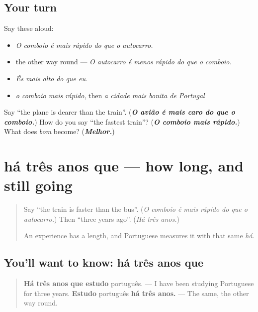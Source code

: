 \subsection*{Your turn}
Say these aloud:

\begin{itemize}
\raggedright
  \item \emph{O comboio é mais rápido do que o autocarro.}
  \item the other way round — \emph{O autocarro é menos rápido do que o comboio.}
  \item \emph{És mais alto do que eu.}
  \item \emph{o comboio mais rápido}, then \emph{a cidade mais bonita de Portugal}
\end{itemize}

\begin{tcolorbox}[breakable,colback=teal!4,colframe=teal!35!black,title={Before you move on}]
Say \textquotedblleft{}the plane is dearer than the train\textquotedblright{}. (\emph{\textbf{O avião é mais caro do que o comboio.}}) How do you say \textquotedblleft{}the fastest train\textquotedblright{}? (\emph{\textbf{O comboio mais rápido.}}) What does \emph{bom} become? (\emph{\textbf{Melhor.}})
\end{tcolorbox}
\section[há três anos que]{há três anos que — how long, and still going}

\label{lesson:PT-C266-ha-tres-anos-que}



\begin{quote}
Say \textquotedblleft{}the train is faster than the bus\textquotedblright{}. (\emph{O comboio é mais rápido do que o autocarro.}) Then \textquotedblleft{}three years ago\textquotedblright{}. (\emph{Há três anos.})

An experience has a length, and Portuguese measures it with that same \emph{há}.
\end{quote}

\subsection*{You'll want to know: há três anos que}
\begin{quote}
\textbf{Há três anos que estudo} português. — I have been studying Portuguese for three years. \textbf{Estudo} português \textbf{há três anos.} — The same, the other way round.
\end{quote}

